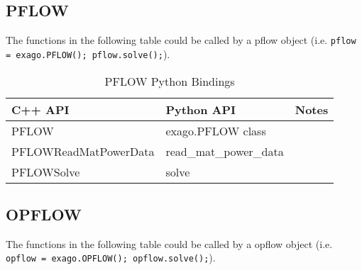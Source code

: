 \subsection{PFLOW} 

The functions in the following table could be called by a pflow object (i.e. \texttt{pflow = exago.PFLOW(); pflow.solve();}).

{ \footnotesize
  \begin{longtable}{|>{\ttfamily}p{}|>{\ttfamily}p{}|p{}|}
    \caption{PFLOW Python Bindings}
    \label{table:pflow-python-bindings } \\
    \hline
    \textbf{\textrm{C++ API}} & \textbf{\textrm{Python API}} & \textbf{Notes}\\ [0.5ex]  
    \hline
    \endfirsthead
    \endhead
    PFLOW & exago.PFLOW class & ~\\
    \hline
    PFLOWReadMatPowerData & read\_mat\_power\_data & ~\\
    \hline
    PFLOWSolve & solve & ~\\
    \hline
\end{longtable}
}

\subsection{OPFLOW} 

The functions in the following table could be called by a opflow object (i.e. \texttt{opflow = exago.OPFLOW(); opflow.solve();}).

